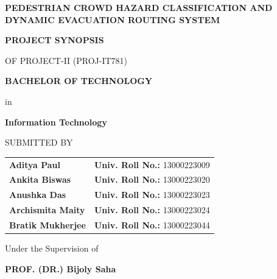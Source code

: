 \documentclass[12pt,a4paper]{article}
\begin{document}
\begin{titlepage}
\thispagestyle{empty}
\begin{center}
    \vspace*{0.1in}
    {\fontsize{20pt}{24pt}\bfseries PEDESTRIAN CROWD HAZARD CLASSIFICATION AND DYNAMIC EVACUATION ROUTING SYSTEM \par}

    \vspace{0.25in}
    {\fontsize{14pt}{17pt}\bfseries PROJECT SYNOPSIS \par}
    \vspace{0.05in}
    {\fontsize{12pt}{15pt}\selectfont OF PROJECT-II (PROJ-IT781) \par}

    \vspace{0.25in}
    {\fontsize{14pt}{17pt}\bfseries BACHELOR OF TECHNOLOGY \par}
    \vspace{0.05in}
    {\fontsize{12pt}{15pt}\selectfont in \par}
    \vspace{0.05in}
    {\fontsize{16pt}{19pt}\bfseries Information Technology \par}

    {\fontsize{12pt}{15pt}\selectfont SUBMITTED BY \par}
    \vspace{0.12in}

    {\fontsize{12pt}{15pt}\selectfont
    \begin{tabular}{p{2.8in}p{2.8in}}
    \textbf{Aditya Paul} & \textbf{Univ. Roll No.:} 13000223009 \\
    \textbf{Ankita Biswas} & \textbf{Univ. Roll No.:} 13000223020 \\
    \textbf{Anushka Das} & \textbf{Univ. Roll No.:} 13000223023 \\
    \textbf{Archismita Maity} & \textbf{Univ. Roll No.:} 13000223024 \\
    \textbf{Bratik Mukherjee} & \textbf{Univ. Roll No.:} 13000223044 \\
    \end{tabular} \par}

    \vfill

    \vspace{0.15in}
    {\fontsize{12pt}{15pt}\selectfont Under the Supervision of \par}
    \vspace{0.05in}
    {\fontsize{14pt}{17pt}\bfseries PROF. (DR.) Bijoly Saha \par}
    \vspace{0.05in}


\end{center}
\end{titlepage}
\end{document}
